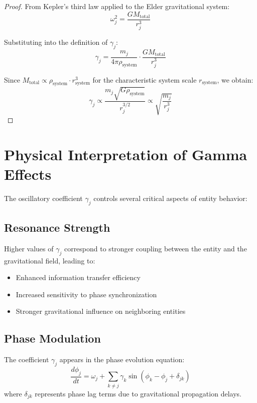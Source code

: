 \begin{proof}
From Kepler's third law applied to the Elder gravitational system:
\begin{equation}
\omega_j^2 = \frac{GM_{\text{total}}}{r_j^3}
\end{equation}

Substituting into the definition of $\gamma_j$:
\begin{equation}
\gamma_j = \frac{m_j}{4\pi \rho_{\text{system}}} \cdot \frac{GM_{\text{total}}}{r_j^3}
\end{equation}

Since $M_{\text{total}} \propto \rho_{\text{system}} \cdot r_{\text{system}}^3$ for the characteristic system scale $r_{\text{system}}$, we obtain:
\begin{equation}
\gamma_j \propto \frac{m_j \sqrt{G\rho_{\text{system}}}}{r_j^{3/2}} \propto \sqrt{\frac{m_j}{r_j^3}}
\end{equation}
\end{proof}

\section{Physical Interpretation of Gamma Effects}

The oscillatory coefficient $\gamma_j$ controls several critical aspects of entity behavior:

\subsection{Resonance Strength}

Higher values of $\gamma_j$ correspond to stronger coupling between the entity and the gravitational field, leading to:
\begin{itemize}
    \item Enhanced information transfer efficiency
    \item Increased sensitivity to phase synchronization
    \item Stronger gravitational influence on neighboring entities
\end{itemize}

\subsection{Phase Modulation}

The coefficient $\gamma_j$ appears in the phase evolution equation:
\begin{equation}
\frac{d\phi_j}{dt} = \omega_j + \sum_{k \neq j} \gamma_k \sin(\phi_k - \phi_j + \delta_{jk})
\end{equation}
where $\delta_{jk}$ represents phase lag terms due to gravitational propagation delays.

